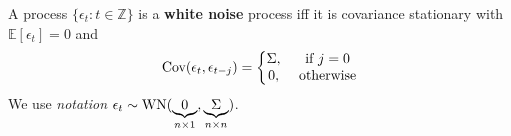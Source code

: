 \documentclass[11pt]{elegantbook}
\begin{document}
\begin{definition}
    A process $\{\epsilon_t:t\in \mathbb{Z}\}$ is a \textbf{white noise} process iff it is covariance stationary with $\mathbb{E}[\epsilon_t]=0$ and
    \begin{equation}
        \begin{aligned}
            \textnormal{Cov}(\epsilon_t,\epsilon_{t-j})=\left\{\begin{matrix}
                \Sigma,& \textnormal{ if }j=0\\
                0,& \textnormal{ otherwise}
            \end{matrix}\right.
        \end{aligned}
        \nonumber
    \end{equation}
    We use \textit{notation} $\epsilon_t\sim \textnormal{WN}(\underbrace{0}_{n\times 1},\underbrace{\Sigma}_{n\times n})$.
\end{definition}
\end{document}

